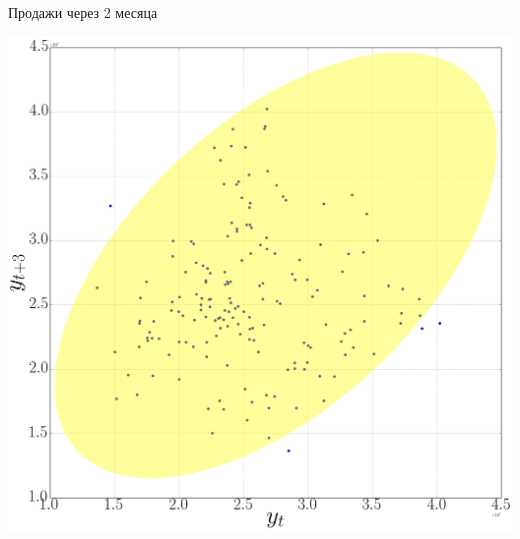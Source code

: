 \documentclass[9pt,pdf,utf8,hyperref={unicode},aspectratio=169]{beamer}
\begin{document}
\begin{frame}{Продажи через 2 месяца}
	\begin{center}
		\includegraphics[height=0.6\textheight]{wine8.png}
	\end{center}
\end{frame}
\end{document}

